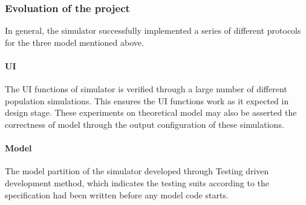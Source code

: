 \subsubsection{Evoluation of the project}
\par\noindent
In general, the simulator successfully implemented a series of different protocols for the three model mentioned above.

\paragraph{UI} The UI functions of simulator is verified through a large number of different population simulations. This ensures the UI functions work as it expected in design stage.
These experiments on theoretical model may also be asserted the correctness of model through the output configuration of these simulations.

\paragraph{Model} The model partition of the simulator developed through Testing driven development method, which indicates the testing suits according to the specification had been written before any
model code starts.
